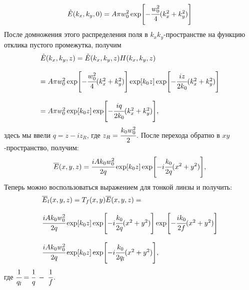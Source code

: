 \begin{equation}
	\hat{E}(k_x, k_y, 0) = A\pi w^2_0\exp[-\cfrac{w^2_0}{4}(k_x^2 + k_y^2)]
\end{equation}
После домножения этого распределения поля в $k_xk_y$-пространстве на функцию отклика пустого промежутка, получим
\begin{equation}
	\label{eq:after_lens}
	\begin{array}{lcl}
	\hat{E}(k_x, k_y, z) = \hat{E}(k_x, k_y, z)H(k_x, k_y, z) 
	\\
	\\
	= A\pi w^2_0\exp[-\cfrac{w^2_0}{4}(k_x^2 + k_y^2)]\exp[k_0z]\exp[-\cfrac{iz}{2k_0}(k^2_x + k^2_y)]
	\\
	\\
	= A\pi w^2_0\exp[k_0z]\exp[-\cfrac{iq}{2k_0}(k^2_x + k^2_y)], 
	\end{array}
\end{equation}
здесь мы ввели $q = z - iz_R$, где $z_R = \cfrac{k_0w^2_0}{2}$. После перехода обратно в $xy$-пространство, получим: 
\begin{equation}
	\overline{E}(x, y, z) = \cfrac{iAk_0w^2_0}{2q}\exp[k_0z]\exp[-i\cfrac{k_0}{2q}(x^2 + y^2)],
\end{equation}
Теперь можно воспользоваться выражением для тонкой линзы и получить:
\begin{equation}
	\begin{array}{lcl}
	\overline{E}_{l}(x, y, z) = T_f(x, y)\overline{E}(x, y, z) = 
	\\
	\\
	\cfrac{iAk_0w^2_0}{2q}\exp[k_0z]\exp[-i\cfrac{k_0}{2q}(x^2 + y^2)]\exp[-\cfrac{ik_0}{2f}(x^2 + y^2)]
	\\
	\\
	\cfrac{iAk_0w^2_0}{2q}\exp[k_0z]\exp[-i\cfrac{k_0}{2q_l}(x^2 + y^2)],
	\end{array}
\end{equation}
где $\cfrac{1}{q_l} = \cfrac{1}{q} \; - \; \cfrac{1}{f}$. \\

